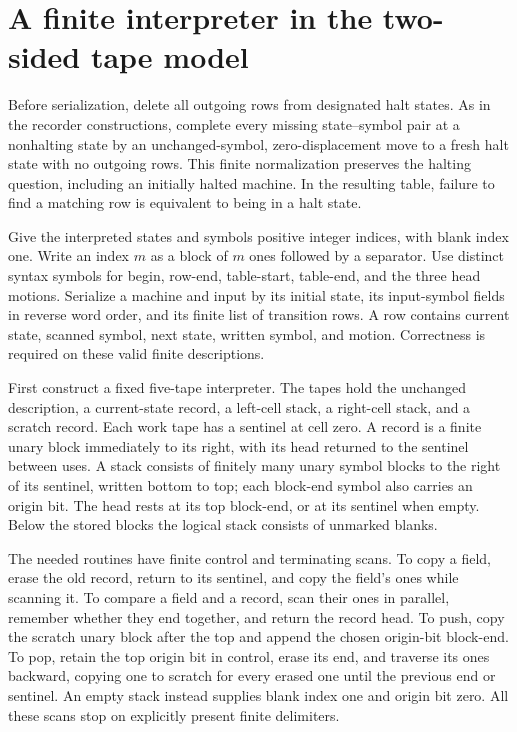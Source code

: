 \section{A finite interpreter in the two-sided tape model}
\label{sv:interpreter}
Before serialization, delete all outgoing rows from designated halt
states.  As in the recorder constructions, complete every missing
state--symbol pair at a nonhalting state by an unchanged-symbol,
zero-displacement move to a fresh halt state with no outgoing rows.
This finite normalization preserves the halting question, including an
initially halted machine.  In the resulting table, failure to find a
matching row is equivalent to being in a halt state.

Give the interpreted states and symbols positive integer indices, with
blank index one.  Write an index $m$ as a block of $m$ ones followed
by a separator.  Use distinct syntax symbols for begin, row-end,
table-start, table-end, and the three head motions.  Serialize a machine
and input by its initial state, its input-symbol fields in reverse word
order, and its finite list of transition rows.  A row contains current
state, scanned symbol, next state, written symbol, and motion.
Correctness is required on these valid finite descriptions.

First construct a fixed five-tape interpreter.  The tapes hold the
unchanged description, a current-state record, a left-cell stack, a
right-cell stack, and a scratch record.  Each work tape has a sentinel
at cell zero.  A record is a finite unary block immediately to its right,
with its head returned to the sentinel between uses.  A stack consists
of finitely many unary symbol blocks to the right of its sentinel,
written bottom to top; each block-end symbol also carries an origin
bit.  The head rests at its top block-end, or at its sentinel when
empty.  Below the stored blocks the logical stack consists of unmarked
blanks.

The needed routines have finite control and terminating scans.  To copy a
field, erase the old record, return to its sentinel, and copy the field's
ones while scanning it.  To compare a field and a record, scan their
ones in parallel, remember whether they end together, and return the
record head.  To push, copy the scratch unary block after the top and
append the chosen origin-bit block-end.  To pop, retain the top origin
bit in control, erase its end, and traverse its ones backward, copying
one to scratch for every erased one until the previous end or sentinel.
An empty stack instead supplies blank index one and origin bit zero.
All these scans stop on explicitly present finite delimiters.

